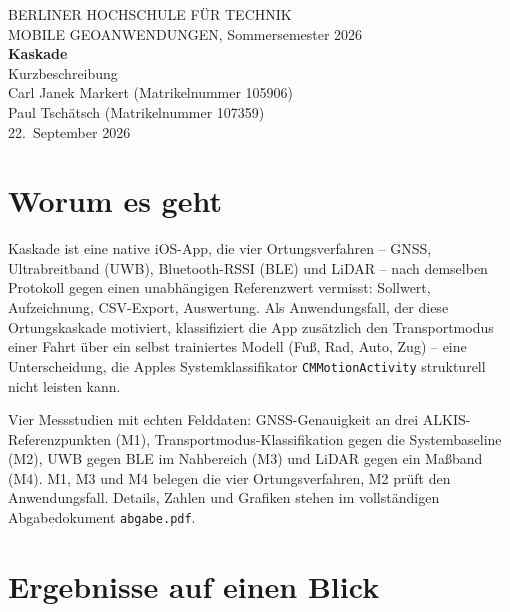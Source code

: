 \documentclass[11pt,a4paper,oneside]{article}
\begin{document}
\begin{center}
{\normalsize BERLINER HOCHSCHULE FÜR TECHNIK}\\[0.2em]
{\small MOBILE GEOANWENDUNGEN, Sommersemester 2026}\\[1.4em]
{\LARGE\textbf{Kaskade}}\\[0.4em]
{\large Kurzbeschreibung}\\[1.2em]
Carl Janek Markert (Matrikelnummer 105906)\\
Paul Tschätsch (Matrikelnummer 107359)\\[0.6em]
22.~September 2026
\end{center}

\vspace{1.5em}

\section*{Worum es geht}

Kaskade ist eine native iOS-App, die vier Ortungsverfahren -- GNSS,
Ultrabreitband (UWB), Bluetooth-RSSI (BLE) und LiDAR -- nach demselben
Protokoll gegen einen unabhängigen Referenzwert vermisst: Sollwert,
Aufzeichnung, CSV-Export, Auswertung. Als Anwendungsfall, der diese
Ortungskaskade motiviert, klassifiziert die App zusätzlich den
Transportmodus einer Fahrt über ein selbst trainiertes Modell (Fuß, Rad,
Auto, Zug) -- eine Unterscheidung, die Apples Systemklassifikator
\texttt{CMMotionActivity} strukturell nicht leisten kann.

Vier Messstudien mit echten Felddaten: GNSS-Genauigkeit an drei
ALKIS-Referenzpunkten (M1), Transportmodus-Klassifikation gegen die
Systembaseline (M2), UWB gegen BLE im Nahbereich (M3) und LiDAR gegen ein
Maßband (M4). M1, M3 und M4 belegen die vier Ortungsverfahren, M2 prüft den
Anwendungsfall. Details, Zahlen und Grafiken stehen im vollständigen
Abgabedokument \texttt{abgabe.pdf}.

\section*{Ergebnisse auf einen Blick}
\end{document}
